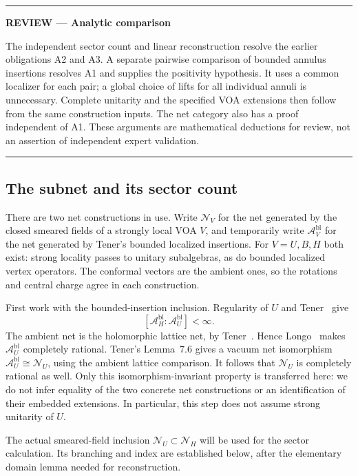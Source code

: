 \documentclass[11pt,a4paper]{article}
\theoremstyle{definition}
\newenvironment{reviewnote}[1]{\par\addvspace{8pt}\begingroup
  \color{Sepia}\noindent\rule{\linewidth}{0.7pt}\par\nobreak
  \noindent\textbf{REVIEW --- #1}\par\nobreak\small\noindent\ignorespaces
}{\par\noindent\rule{\linewidth}{0.7pt}\par\endgroup\addvspace{8pt}}
\begin{document}
\begin{reviewnote}{Analytic comparison}
The independent sector count and linear reconstruction resolve the
earlier obligations A2 and A3.  A separate pairwise comparison of
bounded annulus insertions resolves A1 and supplies the positivity
hypothesis.  It uses a common localizer for each pair; a global choice
of lifts for all individual annuli is unnecessary.  Complete unitarity
and the specified VOA extensions then follow from the same construction
inputs.  The net category also has a proof independent of A1.  These
arguments are mathematical deductions for review, not an assertion of
independent expert validation.
\end{reviewnote}

\subsection{The subnet and its sector count}
\label{subsec:analytic-net-count}

There are two net constructions in use.  Write $\mathcal N_V$ for the
net generated by the closed smeared fields of a strongly local VOA $V$,
and temporarily write $\mathcal A_V^{\mathrm{bl}}$ for the net generated
by Tener's bounded localized insertions.  For $V=U,B,H$ both exist:
strong locality passes to unitary subalgebras, as do bounded localized
vertex operators.  The conformal vectors are the ambient ones, so the
rotations and central charge agree in each construction.

First work with the bounded-insertion inclusion.  Regularity of $U$
and Tener~\cite[Corollary~4.24]{TenFusion} give
\[
 [\mathcal A_H^{\mathrm{bl}}:\mathcal A_U^{\mathrm{bl}}]<\infty.
\]
The ambient net is the holomorphic lattice net, by
Tener~\cite[Proposition~7.5]{TenFields}.  Hence
Longo~\cite[Theorem~24]{Longo} makes $\mathcal A_U^{\mathrm{bl}}$ completely
rational.  Tener's Lemma~7.6 gives a vacuum net isomorphism
$\mathcal A_U^{\mathrm{bl}}\cong\mathcal N_U$, using the ambient
lattice comparison.  It follows that $\mathcal N_U$ is completely
rational as well.  Only this isomorphism-invariant property is
transferred here: we do not infer equality of the two concrete net
constructions or an identification of their embedded extensions.
In particular, this step does not assume strong unitarity of $U$.

The actual smeared-field inclusion $\mathcal N_U\subset\mathcal N_H$
will be used for the sector calculation.  Its branching and index are
established below, after the elementary domain lemma needed for
reconstruction.
\end{document}
